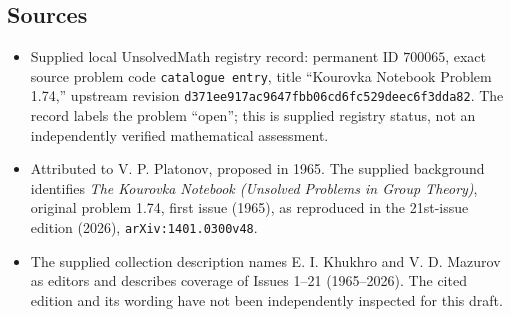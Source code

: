 \documentclass[11pt]{article}
\begin{document}
\subsection{Sources}
\begin{itemize}
\item Supplied local UnsolvedMath registry record: permanent ID \(700065\), exact source problem code \texttt{catalogue entry}, title ``Kourovka Notebook Problem 1.74,'' upstream revision \texttt{d371ee917ac9647fbb06cd6fc529deec6f3dda82}. The record labels the problem ``open''; this is supplied registry status, not an independently verified mathematical assessment.
\item Attributed to V. P. Platonov, proposed in 1965. The supplied background identifies \emph{The Kourovka Notebook (Unsolved Problems in Group Theory)}, original problem 1.74, first issue (1965), as reproduced in the 21st-issue edition (2026), \texttt{arXiv:1401.0300v48}.
\item The supplied collection description names E. I. Khukhro and V. D. Mazurov as editors and describes coverage of Issues 1--21 (1965--2026). The cited edition and its wording have not been independently inspected for this draft.
\end{itemize}
\end{document}
